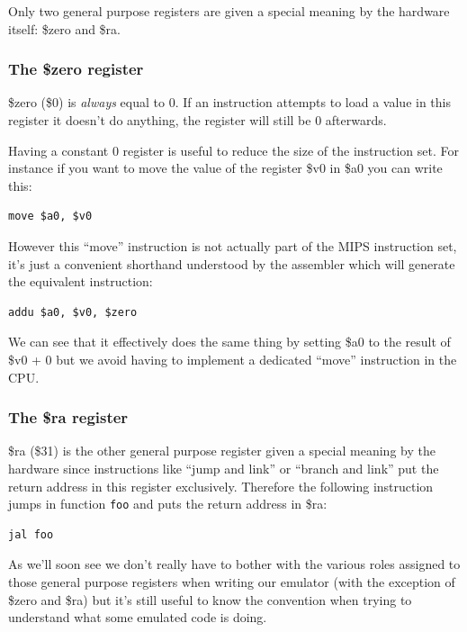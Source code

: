 \documentclass[a4paper]{article}
\newcommand{\code}[1] {\texttt{#1}}
\begin{document}
Only two general purpose registers are given a special meaning by the
hardware itself: \$zero and \$ra.

\subsubsection{The \$zero register}

\$zero (\$0) is \emph{always} equal to 0. If an instruction attempts
to load a value in this register it doesn't do anything, the register
will still be 0 afterwards.

Having a constant 0 register is useful to reduce the size of the
instruction set. For instance if you want to move the value of the
register \$v0 in \$a0 you can write this:

\begin{lstlisting}[language=assembly]
move $a0, $v0
\end{lstlisting}

However this ``move'' instruction is not actually part of the MIPS
instruction set, it's just a convenient shorthand understood by the
assembler which will generate the equivalent instruction:

\begin{lstlisting}[language=assembly]
addu $a0, $v0, $zero
\end{lstlisting}

We can see that it effectively does the same thing by setting \$a0 to
the result of \$v0 + 0 but we avoid having to implement a dedicated
``move'' instruction in the CPU.

\subsubsection{The \$ra register}

\$ra (\$31) is the other general purpose register given a special
meaning by the hardware since instructions like ``jump and link'' or
``branch and link'' put the return address in this register
exclusively. Therefore the following instruction jumps in function
\code{foo} and puts the return address in \$ra:

\begin{lstlisting}[language=assembly]
jal foo
\end{lstlisting}

As we'll soon see we don't really have to bother with the various
roles assigned to those general purpose registers when writing our
emulator (with the exception of \$zero and \$ra) but it's still useful
to know the convention when trying to understand what some emulated
code is doing.
\end{document}
